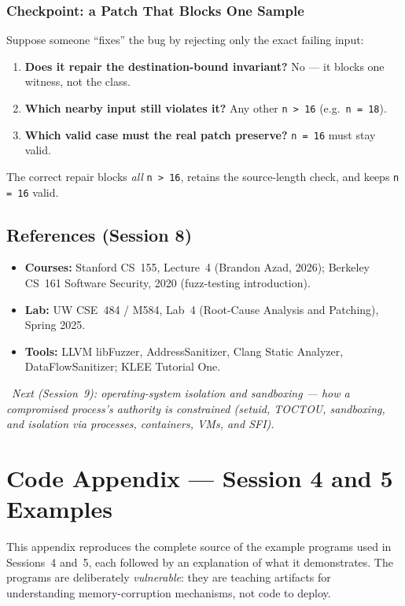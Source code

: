 \documentclass[hidelinks]{article}
\newcommand{\callout}[1]{\par\smallskip\noindent{\color{capri}$\blacktriangleright$}\ \textit{#1}\par\smallskip}
\begin{document}
\subsubsection{Checkpoint: a Patch That Blocks One Sample}

Suppose someone ``fixes'' the bug by rejecting only the exact failing input:
\begin{enumerate}
    \item \textbf{Does it repair the destination-bound invariant?} No --- it blocks one witness, not the class.
    \item \textbf{Which nearby input still violates it?} Any other \texttt{n > 16} (e.g.\ \texttt{n = 18}).
    \item \textbf{Which valid case must the real patch preserve?} \texttt{n = 16} must stay valid.
\end{enumerate}
The correct repair blocks \emph{all} \texttt{n > 16}, retains the source-length check, and keeps \texttt{n = 16} valid.

\subsection{References (Session 8)}

\begin{itemize}
    \item \textbf{Courses:} Stanford CS~155, Lecture~4 (Brandon Azad, 2026); Berkeley CS~161 Software Security, 2020 (fuzz-testing introduction).
    \item \textbf{Lab:} UW CSE~484 / M584, Lab~4 (Root-Cause Analysis and Patching), Spring 2025.
    \item \textbf{Tools:} LLVM libFuzzer, AddressSanitizer, Clang Static Analyzer, DataFlowSanitizer; KLEE Tutorial One.
\end{itemize}

\callout{Next (Session~9): operating-system isolation and sandboxing --- how a compromised process's authority is constrained (setuid, TOCTOU, sandboxing, and isolation via processes, containers, VMs, and SFI).}

\newpage
\section{Code Appendix --- Session 4 and 5 Examples}
\label{sec:code}

This appendix reproduces the complete source of the example programs used in Sessions~4 and~5, each followed by an explanation of what it demonstrates. The programs are deliberately \emph{vulnerable}: they are teaching artifacts for understanding memory-corruption mechanisms, not code to deploy.
\end{document}
